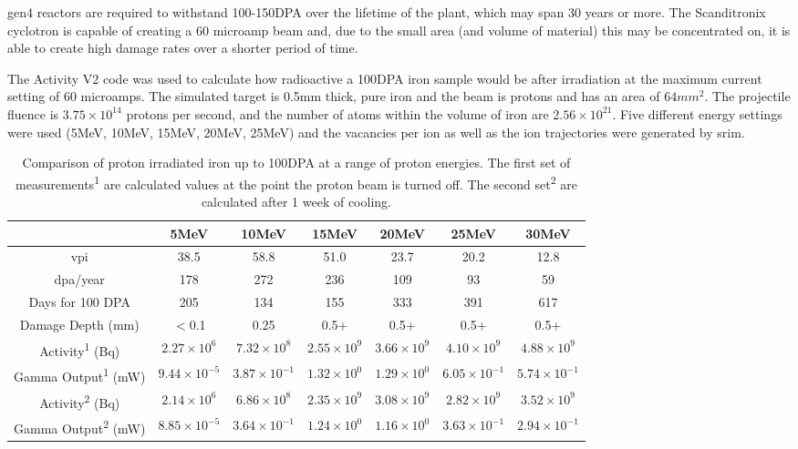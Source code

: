 \Acrlong{gen4} reactors are required to withstand 100-150DPA over the lifetime of the plant, which may span 30 years or more.  The Scanditronix cyclotron is capable of creating a 60 microamp beam and, due to the small area (and volume of material) this may be concentrated on, it is able to create high damage rates over a shorter period of time.

The Activity V2 code was used to calculate how radioactive a 100DPA iron sample would be after irradiation at the maximum current setting of 60 microamps.  The simulated target is 0.5mm thick, pure iron and the beam is protons and has an area of $64mm^2$.  The projectile fluence is $3.75 \times 10^{14}$ protons per second, and the number of atoms within the volume of iron are $2.56 \times 10^{21}$.  Five different energy settings were used (5MeV, 10MeV, 15MeV, 20MeV, 25MeV) and the vacancies per ion as well as the ion trajectories were generated by \acrshort{srim}.

\FloatBarrier
\begin{table}[h]
\begin{center}
\begin{tabular}{c c c c c c c}
\hline\hline
                     & 5MeV & 10MeV & 15MeV & 20MeV & 25MeV & 30MeV \\
\hline\hline
\acrshort{vpi}       & 38.5  & 58.8  & 51.0  & 23.7   & 20.2  &  12.8  \\
\acrshort{dpa}/year  & 178   & 272   & 236   & 109    & 93    &  59    \\
Days for 100 DPA     & 205   & 134   & 155   & 333    & 391   &  617   \\
Damage Depth (mm)    & $<$0.1  & 0.25  & 0.5+  & 0.5+   & 0.5+  &  0.5+  \\
Activity\textsuperscript{1} (Bq)        & ${2.27} \times 10^{6}$  & ${7.32} \times 10^{8}$  & ${2.55} \times 10^{9}$  & ${3.66} \times 10^{9}$  & ${4.10} \times 10^{9}$ & ${4.88} \times 10^{9}$ \\    
Gamma Output\textsuperscript{1} (mW)    & ${9.44} \times 10^{-5}$  & ${3.87} \times 10^{-1}$  & ${1.32} \times 10^{0}$  & ${1.29} \times 10^{0}$  & ${6.05} \times 10^{-1}$ & ${5.74} \times 10^{-1}$ \\ 
Activity\textsuperscript{2} (Bq)        & ${2.14} \times 10^{6}$  & ${6.86} \times 10^{8}$  & ${2.35} \times 10^{9}$  & ${3.08} \times 10^{9}$  & ${2.82} \times 10^{9}$ & ${3.52} \times 10^{9}$ \\    
Gamma Output\textsuperscript{2} (mW)    & ${8.85} \times 10^{-5}$  & ${3.64} \times 10^{-1}$  & ${1.24} \times 10^{0}$  & ${1.16} \times 10^{0}$  & ${3.63} \times 10^{-1}$ & ${2.94} \times 10^{-1}$ \\ 
\hline\hline
\end{tabular}
\end{center}
\caption{Comparison of proton irradiated iron up to 100DPA at a range of proton energies.  The first set of measurements\textsuperscript{1} are calculated values at the point the proton beam is turned off.  The second set\textsuperscript{2} are calculated after 1 week of cooling.}
\label{tab:activitydpairon}
\end{table}

